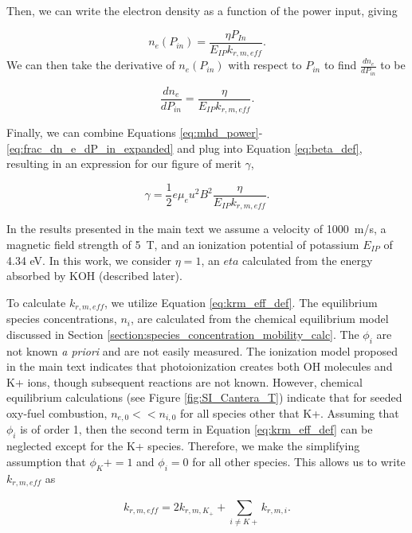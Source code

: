 Then, we can write the electron density as a function of the power input, giving

\begin{equation}
n_{e}(P_{in}) = \frac{\eta P_{In}}{E_{IP}k_{r, m, eff}}.
\end{equation}
We can then take the derivative of $n_{e}(P_{in})$ with respect to $P_{in}$ to find $\frac{dn_{e}}{dP_{in}}$ to be

\begin{equation}
\frac{dn_{e}}{dP_{in}} = \frac{\eta}{E_{IP}k_{r, m, eff}}.
\label{eq:frac_dn_e_dP_in_expanded}
\end{equation}

Finally, we can combine Equations \ref{eq:mhd_power}-\ref{eq:frac_dn_e_dP_in_expanded} and plug into Equation \ref{eq:beta_def}, resulting in an expression for our figure of merit $\gamma$,

\begin{equation}
  \label{eq:gamma-final}
\gamma = \frac{1}{2} e \mu_e u^2 B^2 \frac{\eta}{E_{IP}k_{r, m, eff}}.
\end{equation}

In the results presented in the main text we assume a velocity of \SI{1000}{\meter/\second}, a magnetic field strength of \SI{5}{\tesla}, and an ionization potential of potassium $E_{IP}$ of 4.34 eV. In this work, we consider $\eta = 1$, an $eta$ calculated from the energy absorbed by KOH (described later). 

To calculate $k_{r, m, eff}$, we utilize Equation \ref{eq:krm_eff_def}. The equilibrium species concentrations, $n_i$, are calculated from the chemical equilibrium model discussed in Section \ref{section:species_concentration_mobility_calc}. The $\phi_i$ are not known \emph{a priori} and are not easily measured. The ionization model proposed in the main text indicates that photoionization creates both OH molecules and K+ ions, though subsequent reactions are not known. However, chemical equilibrium calculations (see Figure \ref{fig:SI_Cantera_T}) indicate that for seeded oxy-fuel combustion, $n_{e,0} << n_{i,0}$ for all species other that K+. Assuming that $\phi_i$ is of order 1, then the second term in Equation \ref{eq:krm_eff_def} can be neglected except for the K+ species. Therefore, we make the simplifying assumption that  $\phi_K+ = 1$ and $\phi_i = 0$ for all other species. This allows us to write $k_{r, m, eff}$ as

\begin{equation}
  \label{eq:krm_eff_final}
  k_{r, m, eff} = 2k_{r, m, K_{+}} + \sum_{i \neq K+}^{}k_{r, m, i}.
\end{equation}


